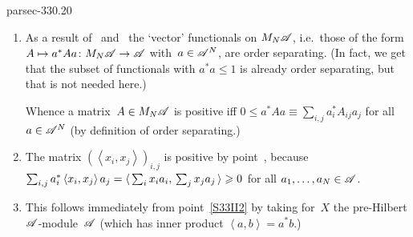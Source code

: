 \documentclass[b5page]{book}
\begin{document}
\begin{solution}{parsec-330.20}%
\begin{enumerate}
\item
\label{S33II1}
As a result of~
and~
the `vector' functionals on $M_N\scrA$,
i.e.~those of the form $A\mapsto a^* A a \colon M_N\scrA\to \scrA$
with~$a\in \scrA^N$,
are order separating.
(In fact, we get
that the subset of functionals with $a^*a\leq 1$ is already
order separating, but that is not needed here.)

Whence a matrix~$A\in M_N\scrA$ is positive
iff $0\leq a^* A a\equiv \sum_{i,j} a_i^* A_{ij} a_j$
for all~$a\in \scrA^N$
(by definition of order separating.)

\item
\label{S33II2}
The matrix $(\left<x_i,x_j\right>)_{i,j}$ is positive
by point~,
because $\sum_{i,j} a_i^* \left<x_i,x_j\right>a_j
=  \left<\,\smash{\sum_ix_i a_i,\,\sum_jx_j a_j\,}\right>\geq 0$
for all $a_1,\dotsc,a_N\in\scrA$.

\item
This follows immediately from point~\ref{S33II2}
by taking for~$X$ the pre-Hilbert $\scrA$-module~$\scrA$
(which has inner product $\left<a,b\right>=a^*b$.)
\end{enumerate}
\end{solution}
\end{document}
